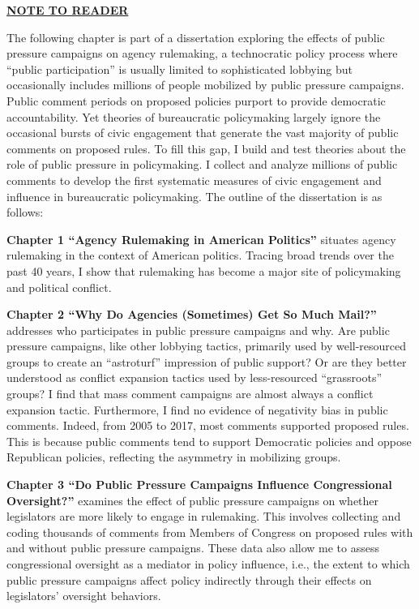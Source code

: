 \documentclass[
      12pt,
        ]{article}
\begin{document}







  \newpage

\noindent 
 
   
   
\centerline{\textbf{\underline{NOTE TO READER}}}

\thispagestyle{empty}

The following chapter is part of a dissertation exploring the effects of public pressure campaigns on agency rulemaking, a technocratic policy process where ``public participation'' is usually limited to sophisticated lobbying but occasionally includes millions of people mobilized by public pressure campaigns. Public comment periods on proposed policies purport to provide democratic accountability. Yet theories of bureaucratic policymaking largely ignore the occasional bursts of civic engagement that generate the vast majority of public comments on proposed rules. To fill this gap, I build and test theories about the role of public pressure in policymaking. I collect and analyze millions of public comments to develop the first systematic measures of civic engagement and influence in bureaucratic policymaking. The outline of the dissertation is as follows:

\textbf{Chapter 1 ``Agency Rulemaking in American Politics''} situates agency rulemaking in the context of American politics. Tracing broad trends over the past 40 years, I show that rulemaking has become a major site of policymaking and political conflict.

\textbf{Chapter 2 ``Why Do Agencies (Sometimes) Get So Much Mail?''} addresses who participates in public pressure campaigns and why. Are public pressure campaigns, like other lobbying tactics, primarily used by well-resourced groups to create an ``astroturf'' impression of public support? Or are they better understood as conflict expansion tactics used by less-resourced ``grassroots'' groups? I find that mass comment campaigns are almost always a conflict expansion tactic. Furthermore, I find no evidence of negativity bias in public comments. Indeed, from 2005 to 2017, most comments supported proposed rules. This is because public comments tend to support Democratic policies and oppose Republican policies, reflecting the asymmetry in mobilizing groups.

\textbf{Chapter 3 ``Do Public Pressure Campaigns Influence Congressional Oversight?''} examines the effect of public pressure campaigns on whether legislators are more likely to engage in rulemaking. This involves collecting and coding thousands of comments from Members of Congress on proposed rules with and without public pressure campaigns. These data also allow me to assess congressional oversight as a mediator in policy influence, i.e., the extent to which public pressure campaigns affect policy indirectly through their effects on legislators' oversight behaviors.
\end{document}
